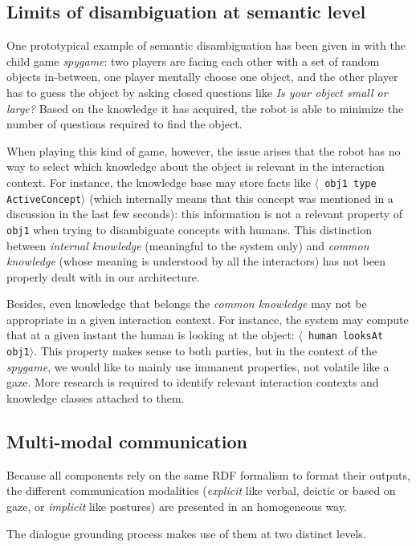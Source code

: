 \documentclass[letterpaper, 10 pt, conference]{ieeeconf}  %
\newcommand{\concept}[1]{{\small \texttt{#1}}}
\newcommand{\stmt}[1]{{\footnotesize \tt $\langle$ #1\relax$\rangle$}}
\begin{document}
\subsection{Limits of disambiguation at semantic level}

One prototypical example of semantic disambiguation has been given in
\cite{Ros2010b} with the child game \emph{spygame}: two players are facing
each other with a set of random objects in-between, one player mentally choose
one object, and the other player has to guess the object by asking closed
questions like \emph{Is your object small or large?} Based on the knowledge it
has acquired, the robot is able to minimize the number of questions required to
find the object.

When playing this kind of game, however, the issue arises that the robot has no
way to select which knowledge about the object is relevant in the interaction
context. For instance, the knowledge base may store facts like \stmt{obj1 type
ActiveConcept} (which internally means that this concept was mentioned in a
discussion in the last few seconds): this information is not a relevant
property of \concept{obj1} when trying to disambiguate concepts with humans.
This distinction between \emph{internal knowledge} (meaningful to
the system only) and \emph{common knowledge} (whose meaning is understood by
all the interactors) has not been properly dealt with in our architecture.

Besides, even knowledge that belongs the \emph{common knowledge} may not be
appropriate in a given interaction context. For instance, the system may
compute that at a given instant the human is looking at the object: \stmt{human
looksAt obj1}. This property makes sense to both parties, but in the context of
the \emph{spygame}, we would like to mainly use immanent properties, not
volatile like a gaze. More research is required to identify relevant
interaction contexts and knowledge classes attached to them.

\subsection{Multi-modal communication}

Because all components rely on the same RDF formalism to format their outputs,
the different communication modalities (\emph{explicit} like verbal, deictic or
based on gaze, or \emph{implicit} like postures) are presented in an
homogeneous way.

The dialogue grounding process makes use of them at two distinct levels.
\end{document}
